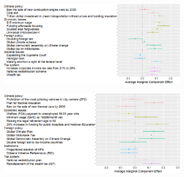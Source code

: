 \begin{figure}[h] 
  \caption[Preferences for various policies in political platforms]{[For Supplementary Material] Effects of the presence of a policy (rather than none from this domain) in a random platform on the likelihood that it is preferred to another random platform. (See non-translated versions in Figure \ref{fig:ca_r_en}; Question \ref{q:conjoint_r}%
  )}\label{fig:ca_r}
  \begin{subfigure}{\textwidth}
    \includegraphics[width=\textwidth]{../figures/US1/ca_r.png}
  \end{subfigure}
  \begin{subfigure}{\textwidth}
    \includegraphics[width=\textwidth]{../figures/FR/ca_r_en.png}
  \end{subfigure}
\end{figure}%
\clearpage
